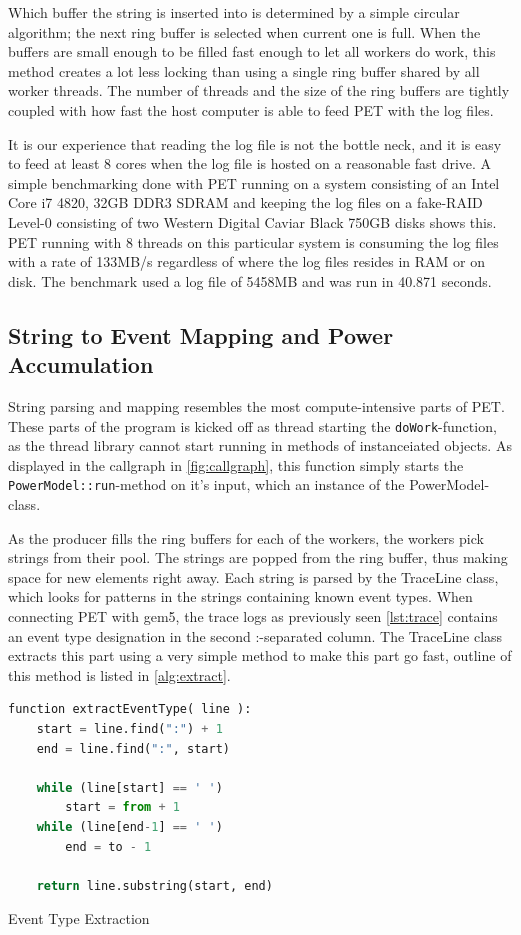 Which buffer the string is inserted into is determined by a simple circular
algorithm; the next ring buffer is selected when current one is full. When the
buffers are small enough to be filled fast enough to let all workers do work,
this method creates a lot less locking than using a single ring buffer shared by
all worker threads. The number of threads and the size of the ring buffers are
tightly coupled with how fast the host computer is able to feed PET with the log
files.

It is our experience that reading the log file is not the bottle neck, and it is
easy to feed at least 8 cores when the log file is hosted on a reasonable fast
drive. A simple benchmarking done with PET running on a system consisting of an
Intel Core i7 4820, 32GB DDR3 SDRAM and keeping the log files on a fake-RAID
Level-0 consisting of two Western Digital Caviar Black 750GB disks shows this.
PET running with 8 threads on this particular system is consuming the log files
with a rate of 133MB/s regardless of where the log files resides in RAM or on
disk. The benchmark used a log file of 5458MB and was run in 40.871 seconds.

\subsection{String to Event Mapping and Power Accumulation}

String parsing and mapping resembles the most compute-intensive parts of PET.
These parts of the program is kicked off as thread starting the
\texttt{doWork}-function, as the thread library cannot start running in methods
of instanceiated objects. As displayed in the callgraph in
\autoref{fig:callgraph}, this function simply starts the
\texttt{PowerModel::run}-method on it's input, which an instance of the
PowerModel-class.

As the producer fills the ring buffers for each of the workers, the workers pick
strings from their pool. The strings are popped from the ring buffer, thus
making space for new elements right away. Each string is parsed by the TraceLine
class, which looks for patterns in the strings containing known event types.
When connecting PET with gem5, the trace logs as previously seen
\autoref{lst:trace} contains an event type designation in the second :-separated
column. The TraceLine class extracts this part using a very simple method to
make this part go fast, outline of this method is listed in
\autoref{alg:extract}.

\begin{algorithm}
    \begin{lstlisting}[style=algo,language=python]
function extractEventType( line ):
    start = line.find(":") + 1
    end = line.find(":", start)

    while (line[start] == ' ')
        start = from + 1
    while (line[end-1] == ' ')
        end = to - 1

    return line.substring(start, end)
    \end{lstlisting}
    \caption{Event Type Extraction}
    \label{alg:extract}
\end{algorithm}

